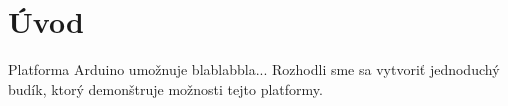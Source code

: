 \chapter*{Úvod}
Platforma Arduino umožnuje blablabbla... Rozhodli sme sa vytvoriť jednoduchý budík, ktorý demonštruje možnosti tejto platformy.

\newpage
